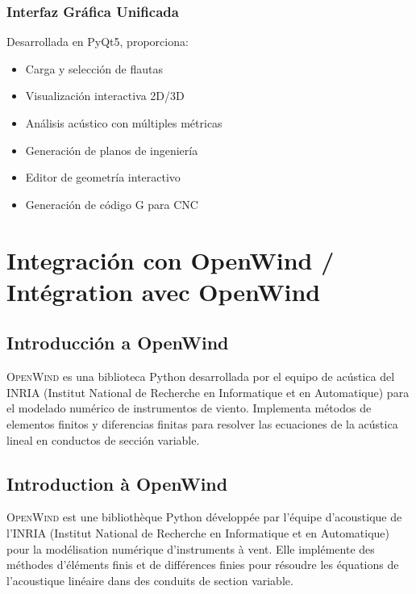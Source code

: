 \documentclass[12pt,a4paper,twocolumn]{article}
\newcommand{\openwind}{\textsc{OpenWind}}
\begin{document}
\subsubsection{Interfaz Gráfica Unificada}

Desarrollada en PyQt5, proporciona:
\begin{itemize}
    \item Carga y selección de flautas
    \item Visualización interactiva 2D/3D
    \item Análisis acústico con múltiples métricas
    \item Generación de planos de ingeniería
    \item Editor de geometría interactivo
    \item Generación de código G para CNC
\end{itemize}

\section{Integración con OpenWind / Intégration avec OpenWind}

\subsection{Introducción a OpenWind}

\openwind{} es una biblioteca Python desarrollada por el equipo de acústica del INRIA (Institut National de Recherche en Informatique et en Automatique) para el modelado numérico de instrumentos de viento. Implementa métodos de elementos finitos y diferencias finitas para resolver las ecuaciones de la acústica lineal en conductos de sección variable.

\subsection{Introduction à OpenWind}

\openwind{} est une bibliothèque Python développée par l'équipe d'acoustique de l'INRIA (Institut National de Recherche en Informatique et en Automatique) pour la modélisation numérique d'instruments à vent. Elle implémente des méthodes d'éléments finis et de différences finies pour résoudre les équations de l'acoustique linéaire dans des conduits de section variable.
\end{document}
